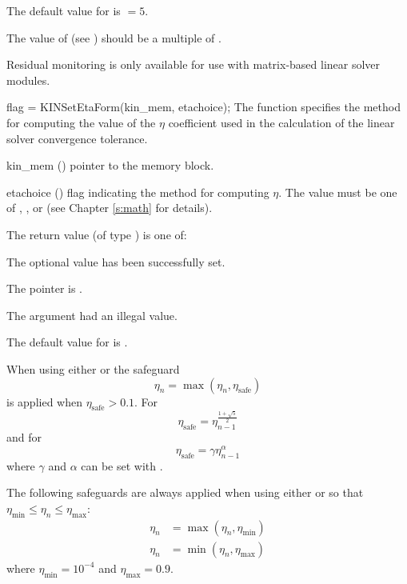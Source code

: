 {
  The default value for  is  $=5$.

  The value of  (see ) should be a multiple
  of .

  {\warn}Residual monitoring is only available for use with
  matrix-based linear solver modules.
}
{
flag = KINSetEtaForm(kin\_mem, etachoice);
}
{
  The function  specifies the method for computing
  the value of the $\eta$ coefficient used in the calculation of the
  linear solver convergence tolerance.
}
{
  \begin{args}[etachoice]
  \item[kin\_mem] ()
    pointer to the {\kinsol} memory block.
  \item[etachoice] ()
    flag indicating the method for computing $\eta$. The value must be one
    of , , or 
    (see Chapter \ref{s:math} for details).
  \end{args}
}
{
  The return value  (of type ) is one of:
  \begin{args}
  \item[\Id{KIN\_SUCCESS}]
    The optional value has been successfully set.
  \item[\Id{KIN\_MEM\_NULL}]
    The  pointer is .
  \item[\Id{KIN\_ILL\_INPUT}]
    The argument  had an illegal value.
  \end{args}
}
{
  The default value for  is .

  When using either  or  the safeguard
  \begin{equation*}
    \eta_n = \max(\eta_n, \eta_{\text{safe}})
  \end{equation*}
  is applied when $\eta_{\text{safe}} > 0.1$. For 
  \begin{equation*}
    \eta_{\text{safe}} = \eta_{n-1}^{\frac{1+\sqrt{5}}{2}}
  \end{equation*}
  and for 
  \begin{equation*}
    \eta_{\text{safe}} = \gamma \eta_{n-1}^{\alpha}
  \end{equation*}
  where $\gamma$ and $\alpha$ can be set with .

  The following safeguards are always applied when using either
   or  so that
  $\eta_{\text{min}} \leq \eta_n \leq \eta_{\text{max}}$:
  \begin{align*}
    \eta_n &= \max(\eta_n, \eta_{\text{min}}) \\
    \eta_n &= \min(\eta_n, \eta_{\text{max}})
  \end{align*}
  where $\eta_{\text{min}} = 10^{-4}$ and $\eta_{\text{max}} = 0.9$.
}
